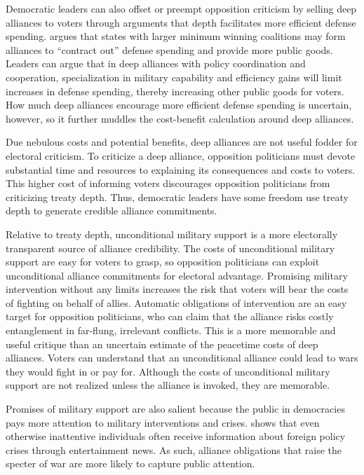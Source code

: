 \documentclass[12pt]{article}
\begin{document}
Democratic leaders can also offset or preempt opposition criticism by selling deep alliances to voters through arguments that depth facilitates more efficient defense spending. 
\citet{Kimball2010} argues that states with larger minimum winning coalitions may form alliances to ``contract out'' 
defense spending and provide more public goods. 
Leaders can argue that in deep alliances with policy coordination and cooperation, specialization in military capability and efficiency gains will limit increases in defense spending, thereby increasing other public goods for voters.  
How much deep alliances encourage more efficient defense spending is uncertain, however, so it further muddles the cost-benefit calculation around deep alliances. 


Due nebulous costs and potential benefits, deep alliances are not useful fodder for electoral criticism.
To criticize a deep alliance, opposition politicians must devote substantial time and resources to explaining its consequences and costs to voters.  
This higher cost of informing voters discourages opposition politicians from criticizing treaty depth. 
Thus, democratic leaders have some freedom use treaty depth to generate credible alliance commitments. 


Relative to treaty depth, unconditional military support is a more electorally transparent source of alliance credibility. 
The costs of unconditional military support are easy for voters to grasp, so opposition politicians can exploit unconditional alliance commitments for electoral advantage. 
Promising military intervention without any limits increases the risk that voters will bear the costs of fighting on behalf of allies. 
Automatic obligations of intervention are an easy target for opposition politicians, who can claim that the alliance risks costly entanglement in far-flung, irrelevant conflicts.  
This is a more memorable and useful critique than an uncertain estimate of the peacetime costs of deep alliances. 
Voters can understand that an unconditional alliance could lead to wars they would fight in or pay for. 
Although the costs of unconditional military support are not realized unless the alliance is invoked, they are memorable. 


Promises of military support are also salient because the public in democracies pays more attention to military interventions and crises. 
\citet{Baum2002} shows that even otherwise inattentive individuals often receive information about foreign policy crises through entertainment news. 
As such, alliance obligations that raise the specter of war are more likely to capture public attention. 
\end{document}

